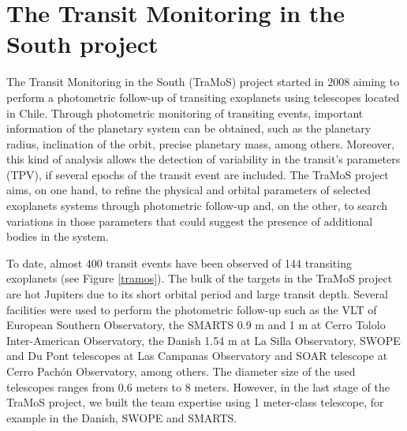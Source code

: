 \chapter{The Transit Monitoring in the South project}\label{chap:tramos}

The Transit Monitoring in the South (TraMoS) project started in 2008 aiming to perform a photometric follow-up of transiting exoplanets using telescopes located in Chile.  Through photometric monitoring of transiting events, important information of the planetary system can be obtained, such as the planetary radius, inclination of the orbit, precise planetary mass, among others. Moreover, this kind of analysis allows the detection of variability in the transit's parameters (TPV), if several epochs of the transit event are included. The TraMoS project aims, on one hand, to refine the physical and orbital parameters of selected exoplanets systems through photometric follow-up and, on the other, to search variations in those parameters that could suggest the presence of additional bodies in the system. 

To date, almost 400 transit events have been observed of 144 transiting exoplanets (see Figure \ref{tramos}). The bulk of the targets in the TraMoS project are hot Jupiters due to its short orbital period and large transit depth. Several facilities were used to perform the photometric follow-up such as the VLT of European Southern Observatory, the SMARTS 0.9 m and 1 m at Cerro Tololo Inter-American Observatory, the Danish 1.54 m at La Silla Observatory, SWOPE and Du Pont telescopes at Las Campanas Observatory and SOAR telescope at Cerro Pachón Observatory, among others. The diameter size of the used telescopes ranges from 0.6 meters to 8 meters. However, in the last stage of the TraMoS project, we built the team expertise using 1 meter-class telescope, for example in the Danish, SWOPE and SMARTS.

